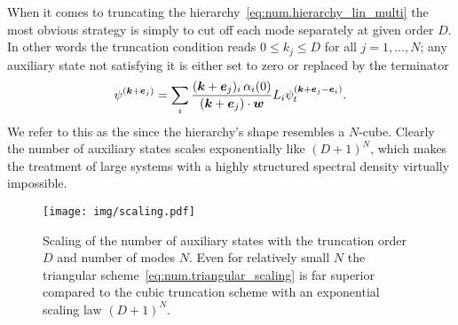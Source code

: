 When it comes to truncating the hierarchy~\ref{eq:num.hierarchy_lin_multi} the most obvious strategy is simply to cut off each mode separately at given order $D$.
In other words the truncation condition reads $0 \le k_j \le D$ for all $j=1,\dots,N$; any auxiliary state not satisfying it is either set to zero or replaced by the terminator
\begin{equation*}
  \psi^{(\boldsymbol{k}+\boldsymbol{e}_j)}
  = \sum_i  \frac{(\boldsymbol{k} + \boldsymbol{e}_j)_i \, \alpha_i(0)}{(\boldsymbol{k}+\boldsymbol{e}_j)\cdot\boldsymbol{w}} L_i \psi^{(\boldsymbol{k} +\boldsymbol{e}_j - \boldsymbol{e}_i)}_t.
\end{equation*}
We refer to this as the  since the hierarchy's shape resembles a $N$-cube.%
Clearly the number of auxiliary states scales exponentially like $(D+1)^N$, which makes the treatment of large systems with a highly structured spectral density virtually impossible.

\begin{figure}
  \centering
  \texttt{[image: img/scaling.pdf]}
  \caption{%
    Scaling of the number of auxiliary states with the truncation order $D$ and number of modes $N$.
    Even for relatively small $N$ the triangular scheme~\ref{eq:num.triangular_scaling} is far superior compared to the cubic truncation scheme with an exponential scaling law $(D+1)^N$.
  }
  \label{fig:num.scaling}
\end{figure}

